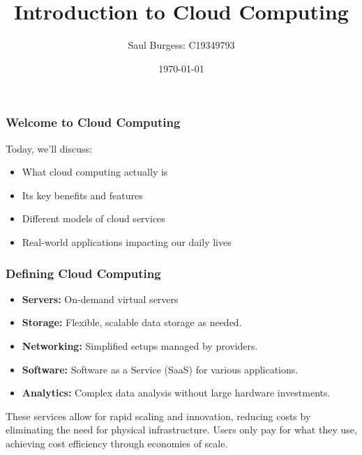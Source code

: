 \documentclass{beamer}
\title{Introduction to Cloud Computing}
\author{Saul Burgess: C19349793}
\date{\today}
\begin{document}
\frame{\titlepage}

\begin{frame}
    \frametitle{Welcome to Cloud Computing}
    \vspace{10pt} %

    Today, we'll discuss:
    \begin{itemize}
        \item{What cloud computing actually is}
        \item{Its key benefits and features}
        \item{Different models of cloud services}
        \item{Real{-}world applications impacting our daily lives}
    \end{itemize}
\end{frame}

\begin{frame}
    \frametitle{Defining Cloud Computing}
    \vspace{10pt} %

    \begin{itemize}
        \item\textbf{Servers:} On{-}demand virtual servers
        \item\textbf{Storage:} Flexible, scalable data storage as needed.
        \item\textbf{Networking:} Simplified setups managed by providers.
        \item\textbf{Software:} Software as a Service (SaaS) for various applications.
        \item\textbf{Analytics:} Complex data analysis without large hardware investments.
    \end{itemize}

    \vspace{10pt} %

    These services allow for rapid scaling and innovation, reducing costs by eliminating the need for physical infrastructure. Users only pay for what they use, achieving cost efficiency through economies of scale.
\end{frame}
\end{document}
